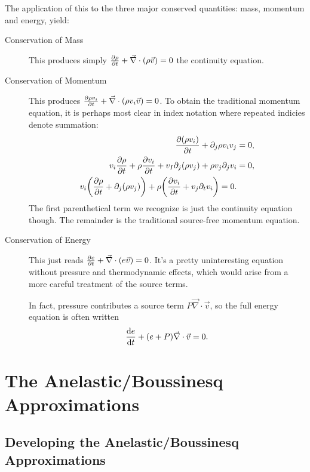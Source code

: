 \documentclass[11pt,
        usenames, %
        dvipsnames %
    ]{report}
\newcommand*{\rd}[2]{\frac{\mathrm{d}#1}{\mathrm{d}#2}}
\newcommand*{\pd}[2]{\frac{\partial#1}{\partial#2}}
\DeclarePairedDelimiter\p{\lparen}{\rparen}
\begin{document}
The application of this to the three major conserved quantities: mass, momentum
and energy, yield:
\begin{description}
    \item[Conservation of Mass] This produces simply $\pd{\rho}{t} +
        \vec{\nabla} \cdot \p*{\rho \vec{v}} = 0$ the continuity equation.

    \item[Conservation of Momentum] This produces $\pd{\rho v_i}{t} +
        \vec{\nabla} \cdot \p*{\rho v_i \vec{v}} = 0$. To obtain the traditional
        momentum equation, it is perhaps most clear in index notation where
        repeated indicies denote summation:
        \begin{align}
            \pd{\p*{\rho v_i}}{t} + \partial_j \rho v_iv_j &= 0,\nonumber\\
            v_i \pd{\rho}{t} + \rho \pd{v_i}{t} + v_I \partial_j \p*{\rho v_j}
                + \rho v_j \partial_j v_i &= 0,\nonumber\\
            v_i\p*{\pd{\rho}{t} + \partial_j \p*{\rho v_j}}
                + \rho\p*{
                    \pd{v_i}{t} + v_j \partial_t v_i
                } = 0.
        \end{align}
        The first parenthetical term we recognize is just the continuity
        equation though. The remainder is the traditional source-free momentum
        equation.

    \item[Conservation of Energy] This just reads $\pd{e}{t} + \vec{\nabla}
        \cdot \p*{e \vec{v}} = 0$. It's a pretty uninteresting equation without
        pressure and thermodynamic effects, which would arise from a more
        careful treatment of the source terms.

        In fact, pressure contributes a source term $P\vec{\nabla} \cdot
        \vec{v}$, so the full energy equation is often written
        \begin{equation}
            \rd{e}{t} + \p*{e + P}\vec{\nabla} \cdot \vec{v} = 0.
        \end{equation}
\end{description}

\section{The Anelastic/Boussinesq Approximations}

\subsection{Developing the Anelastic/Boussinesq Approximations}
\end{document}
